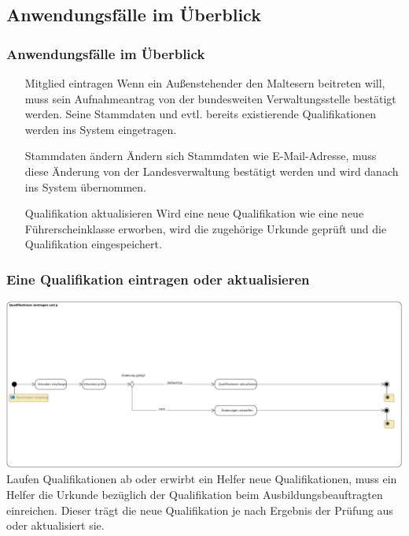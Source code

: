 \documentclass{beamer}
\begin{document}
\subsection{Anwendungsfälle im Überblick}		
\begin{frame}
\frametitle{Anwendungsfälle im Überblick}
\begin{itemize}
	\item [Mitglied eintragen] Wenn ein Außenstehender den Maltesern beitreten will, muss sein Aufnahmeantrag von der bundesweiten Verwaltungsstelle bestätigt werden. Seine Stammdaten und evtl. bereits existierende Qualifikationen werden ins System eingetragen.
	\pause
	\item  [Stammdaten ändern] Ändern sich Stammdaten wie E-Mail-Adresse, muss diese Änderung von der Landesverwaltung bestätigt werden und wird danach ins System übernommen.
	\pause
	\item [Qualifikation aktualisieren] Wird eine neue Qualifikation wie eine neue Führerscheinklasse erworben, wird die zugehörige Urkunde geprüft und die Qualifikation eingespeichert.
\end{itemize}
\end{frame}
\begin{frame}
\frametitle{Eine Qualifikation eintragen oder aktualisieren}
\includegraphics[width=\textwidth]{PDF/BusinessP/Qualifikation_eintragen.pdf}
\pause
Laufen Qualifikationen ab oder erwirbt ein Helfer neue Qualifikationen, muss ein Helfer die Urkunde bezüglich der Qualifikation beim Ausbildungsbeauftragten einreichen. Dieser trägt die neue Qualifikation je nach Ergebnis der Prüfung aus oder aktualisiert sie.
\end{frame}
\end{document}
